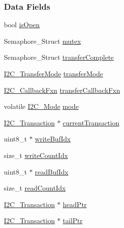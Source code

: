 \subsubsection*{Data Fields}
\begin{DoxyCompactItemize}
\item 
bool \hyperlink{struct_i2_c_u_s_c_i_b___object_afeb44b52b987f4c80b89c6a1378c2eba}{is\-Open}
\item 
Semaphore\-\_\-\-Struct \hyperlink{struct_i2_c_u_s_c_i_b___object_a9450acaa87fe47f8397af7ce27bdc035}{mutex}
\item 
Semaphore\-\_\-\-Struct \hyperlink{struct_i2_c_u_s_c_i_b___object_a56e536e46f1ec628a3e29c7840b1222d}{transfer\-Complete}
\item 
\hyperlink{_i2_c_8h_a39f3b9340fc4ee241b0d2da9b2841c26}{I2\-C\-\_\-\-Transfer\-Mode} \hyperlink{struct_i2_c_u_s_c_i_b___object_ab390f22549ab4e5c58c45b44d0a80ee5}{transfer\-Mode}
\item 
\hyperlink{_i2_c_8h_a5ece918abf136397f682df3924441634}{I2\-C\-\_\-\-Callback\-Fxn} \hyperlink{struct_i2_c_u_s_c_i_b___object_a7872c208c44ff74d3236ed461bb34645}{transfer\-Callback\-Fxn}
\item 
volatile \hyperlink{_i2_c_8h_ac8f0941a68f18f5d1743a21ab32c7929}{I2\-C\-\_\-\-Mode} \hyperlink{struct_i2_c_u_s_c_i_b___object_ad6e84cf3e124a3504d164489e3ca47a2}{mode}
\item 
\hyperlink{struct_i2_c___transaction}{I2\-C\-\_\-\-Transaction} $\ast$ \hyperlink{struct_i2_c_u_s_c_i_b___object_ae84259e66b519c7957a0fea24a911319}{current\-Transaction}
\item 
uint8\-\_\-t $\ast$ \hyperlink{struct_i2_c_u_s_c_i_b___object_a7d490cd7e12fb848419136df434335c9}{write\-Buf\-Idx}
\item 
size\-\_\-t \hyperlink{struct_i2_c_u_s_c_i_b___object_aaa9a959f9853f9fbd4d055a349baa9c7}{write\-Count\-Idx}
\item 
uint8\-\_\-t $\ast$ \hyperlink{struct_i2_c_u_s_c_i_b___object_aa7772fe14627264dde985b236887645e}{read\-Buf\-Idx}
\item 
size\-\_\-t \hyperlink{struct_i2_c_u_s_c_i_b___object_a309d7d2e3b085bca2dd25bbec4e5971b}{read\-Count\-Idx}
\item 
\hyperlink{struct_i2_c___transaction}{I2\-C\-\_\-\-Transaction} $\ast$ \hyperlink{struct_i2_c_u_s_c_i_b___object_a170a701f539bd2277fbe1e0baa9ba2ea}{head\-Ptr}
\item 
\hyperlink{struct_i2_c___transaction}{I2\-C\-\_\-\-Transaction} $\ast$ \hyperlink{struct_i2_c_u_s_c_i_b___object_a950f31fac4375f5e790d5844ae192872}{tail\-Ptr}
\end{DoxyCompactItemize}


